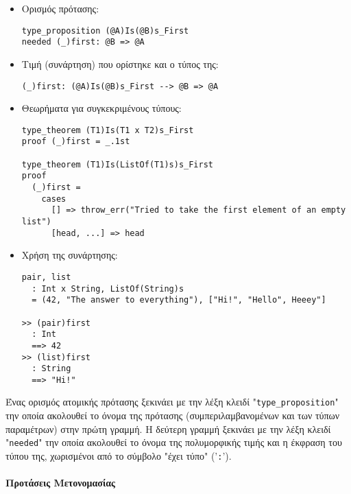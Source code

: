 \documentclass[diploma]{softlab-thesis}
\begin{document}
\begin{itemize}
\begin{itemize}
\item Ορισμός πρότασης:

\begin{verbatim}
type_proposition (@A)Is(@B)s_First
needed (_)first: @B => @A
\end{verbatim}

\item Τιμή (συνάρτηση) που ορίστηκε και ο τύπος της:

\begin{verbatim}
(_)first: (@A)Is(@B)s_First --> @B => @A
\end{verbatim}

\item Θεωρήματα για συγκεκριμένους τύπους:

\begin{verbatim}
type_theorem (T1)Is(T1 x T2)s_First
proof (_)first = _.1st

type_theorem (T1)Is(ListOf(T1)s)s_First
proof
  (_)first =
    cases
      [] => throw_err("Tried to take the first element of an empty list")
      [head, ...] => head
\end{verbatim}

\item Χρήση της συνάρτησης:
\begin{verbatim}
pair, list
  : Int x String, ListOf(String)s
  = (42, "The answer to everything"), ["Hi!", "Hello", Heeey"]

>> (pair)first
  : Int
  ==> 42
>> (list)first
  : String
  ==> "Hi!"
\end{verbatim}
\end{itemize}

Ένας ορισμός ατομικής πρότασης ξεκινάει με την λέξη κλειδί
"\verb|type_proposition|" την οποία ακολουθεί το όνομα της πρότασης
(συμπεριλαμβανομένων και των τύπων παραμέτρων) στην πρώτη γραμμή.  Η δεύτερη
γραμμή ξεκινάει με την λέξη κλειδί "\verb|needed|" την οποία ακολουθεί το όνομα
της πολυμορφικής τιμής και η έκφραση του τύπου της, χωρισμένοι από το σύμβολο
"έχει τύπο" ('\verb|:|').

\end{itemize}

\newpage

\paragraph{Προτάσεις Μετονομασίας}
\end{document}
